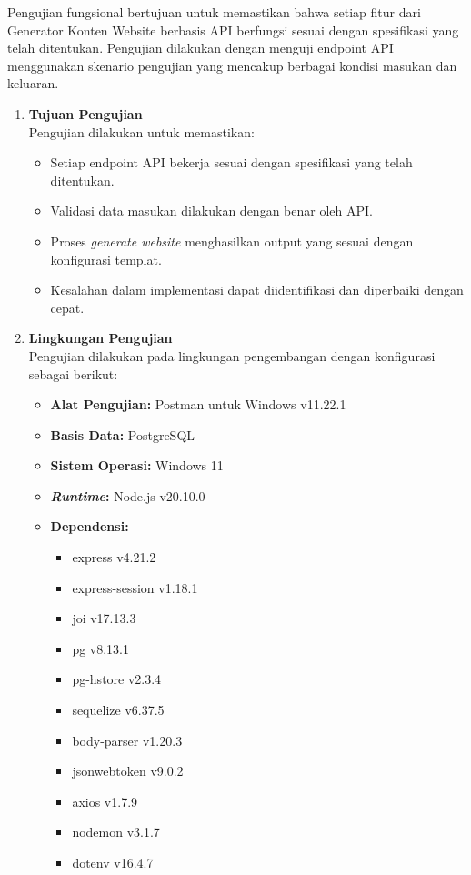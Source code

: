 Pengujian fungsional bertujuan untuk memastikan bahwa setiap fitur dari Generator Konten Website berbasis API berfungsi sesuai dengan spesifikasi yang telah ditentukan. Pengujian dilakukan dengan menguji endpoint API menggunakan skenario pengujian yang mencakup berbagai kondisi masukan dan keluaran.

\begin{enumerate}[label*=\arabic*.,ref=\arabic*]

    \item \textbf{Tujuan Pengujian}\\
    Pengujian dilakukan untuk memastikan:
    \begin{itemize}
        \item Setiap endpoint API bekerja sesuai dengan spesifikasi yang telah ditentukan.
        \item Validasi data masukan dilakukan dengan benar oleh API.
        \item Proses \textit{generate website} menghasilkan output yang sesuai dengan konfigurasi templat.
        \item Kesalahan dalam implementasi dapat diidentifikasi dan diperbaiki dengan cepat.
    \end{itemize}

    \item \textbf{Lingkungan Pengujian}\\
    Pengujian dilakukan pada lingkungan pengembangan dengan konfigurasi sebagai berikut:
    \begin{itemize}
        \item \textbf{Alat Pengujian:} Postman untuk Windows v11.22.1
        \item \textbf{Basis Data:} PostgreSQL
        \item \textbf{Sistem Operasi:} Windows 11
        \item \textbf{\textit{Runtime}:} Node.js v20.10.0
        \item \textbf{Dependensi:} 
        \begin{itemize}
            \item express v4.21.2
            \item express-session v1.18.1
            \item joi v17.13.3
            \item pg v8.13.1
            \item pg-hstore v2.3.4
            \item sequelize v6.37.5
            \item body-parser v1.20.3
            \item jsonwebtoken v9.0.2
            \item axios v1.7.9
            \item nodemon v3.1.7
            \item dotenv v16.4.7
        \end{itemize}
    \end{itemize}


\end{enumerate}
